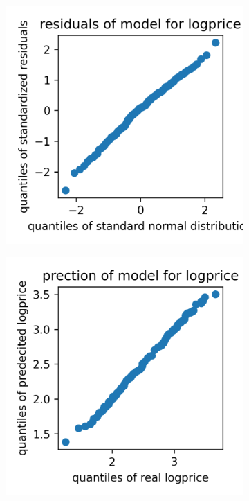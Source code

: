 \documentclass[12 pt]{scrartcl}
\begin{document}
\begin{figure}[htb]
  \begin{subfigure}[b]{0.32\textwidth}
    \centering
    \includegraphics[width=\textwidth]{./images/qqplot_resz_logprice.png}
    \label{fig:qqplotreszlogprice}
  \end{subfigure}
  \begin{subfigure}[b]{0.32\textwidth}
    \centering
    \includegraphics[width=\textwidth]{./images/qqplot_yyhat_logprice.png}

\end{subfigure}
\end{figure}
\end{document}
